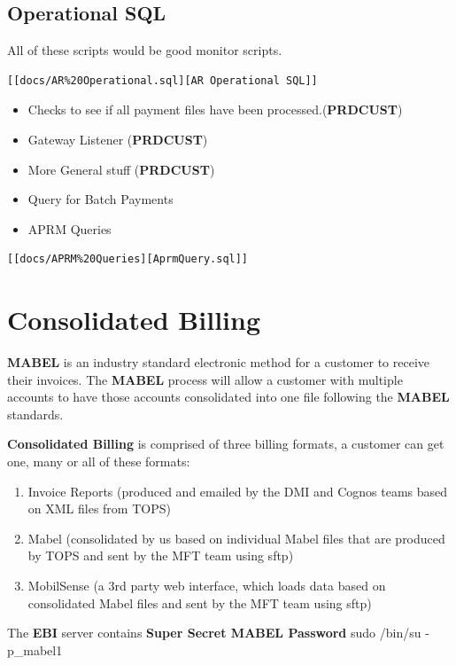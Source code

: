 \documentclass[12pt,twoside]{article}
\begin{document}
\subsection{Operational SQL}
\label{sec:orgheadline35}
All of these scripts would be good monitor scripts.
\begin{verbatim}
[[docs/AR%20Operational.sql][AR Operational SQL]]
\end{verbatim}

\begin{itemize}
\item Checks to see if all payment files have been
processed.(\textbf{PRDCUST})
\item Gateway Listener (\textbf{PRDCUST})
\item More General stuff (\textbf{PRDCUST})
\item Query for Batch Payments
\end{itemize}
\begin{itemize}
\item APRM Queries
\end{itemize}
\begin{verbatim}
[[docs/APRM%20Queries][AprmQuery.sql]]
\end{verbatim}

\section{Consolidated Billing}
\label{sec:orgheadline50}
\textbf{MABEL} is an industry standard electronic method for a customer to receive their invoices.  
The \textbf{MABEL} process will allow a customer with multiple accounts to have those accounts consolidated into one file following the \textbf{MABEL} standards. 

\textbf{Consolidated Billing} is comprised of three billing formats, a customer can get one, many or all of these formats:
\begin{enumerate}
\item Invoice Reports (produced and emailed by the DMI and Cognos teams based on XML files from TOPS)
\item Mabel (consolidated by us based on individual Mabel files that are produced by TOPS and sent by the MFT team using sftp)
\item MobilSense (a 3rd party web interface, which loads data based on consolidated Mabel files and sent by the MFT team using sftp)
\end{enumerate}

The \textbf{EBI} server contains 
\textbf{Super Secret MABEL Password} sudo /bin/su - p\_mabel1
\end{document}
